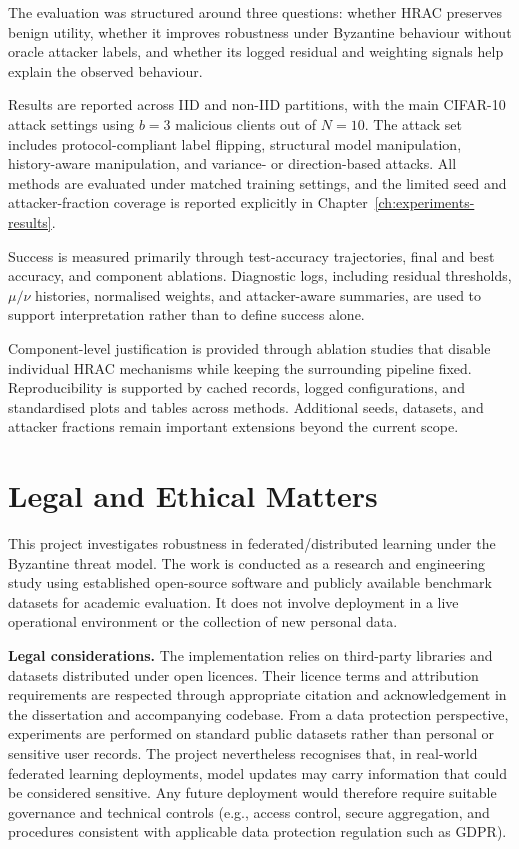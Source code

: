 The evaluation was structured around three questions: whether HRAC preserves benign utility, whether it improves robustness under Byzantine behaviour without oracle attacker labels, and whether its logged residual and weighting signals help explain the observed behaviour.

Results are reported across IID and non-IID partitions, with the main CIFAR-10 attack settings using $b=3$ malicious clients out of $N=10$. The attack set includes protocol-compliant label flipping, structural model manipulation, history-aware manipulation, and variance- or direction-based attacks. All methods are evaluated under matched training settings, and the limited seed and attacker-fraction coverage is reported explicitly in Chapter~\ref{ch:experiments-results}.

Success is measured primarily through test-accuracy trajectories, final and best accuracy, and component ablations. Diagnostic logs, including residual thresholds, $\mu/\nu$ histories, normalised weights, and attacker-aware summaries, are used to support interpretation rather than to define success alone.

Component-level justification is provided through ablation studies that disable individual HRAC mechanisms while keeping the surrounding pipeline fixed. Reproducibility is supported by cached records, logged configurations, and standardised plots and tables across methods. Additional seeds, datasets, and attacker fractions remain important extensions beyond the current scope.

\section{Legal and Ethical Matters}

This project investigates robustness in federated/distributed learning under the Byzantine threat model. The work is conducted as a research and engineering study using established open-source software and publicly available benchmark datasets for academic evaluation. It does not involve deployment in a live operational environment or the collection of new personal data.

\textbf{Legal considerations.}
The implementation relies on third-party libraries and datasets distributed under open licences. Their licence terms and attribution requirements are respected through appropriate citation and acknowledgement in the dissertation and accompanying codebase. From a data protection perspective, experiments are performed on standard public datasets rather than personal or sensitive user records. The project nevertheless recognises that, in real-world federated learning deployments, model updates may carry information that could be considered sensitive. Any future deployment would therefore require suitable governance and technical controls (e.g., access control, secure aggregation, and procedures consistent with applicable data protection regulation such as GDPR).

